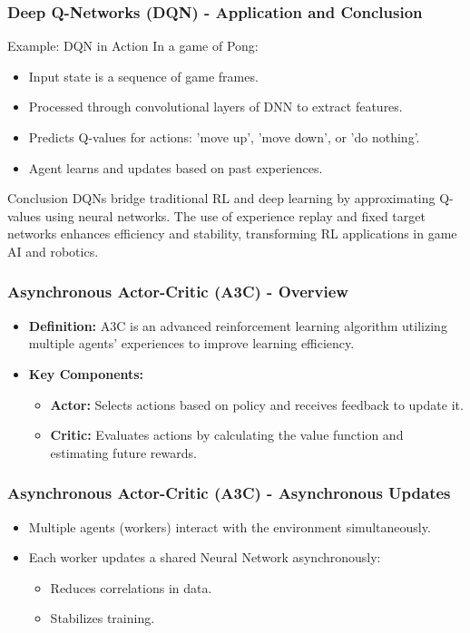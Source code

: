 \documentclass{beamer}
\begin{document}
\begin{frame}[fragile]
    \frametitle{Deep Q-Networks (DQN) - Application and Conclusion}
    \begin{block}{Example: DQN in Action}
        In a game of Pong:
        \begin{itemize}
            \item Input state is a sequence of game frames.
            \item Processed through convolutional layers of DNN to extract features.
            \item Predicts Q-values for actions: 'move up', 'move down', or 'do nothing'.
            \item Agent learns and updates based on past experiences.
        \end{itemize}
    \end{block}

    \begin{block}{Conclusion}
        DQNs bridge traditional RL and deep learning by approximating Q-values using 
        neural networks. The use of experience replay and fixed target networks 
        enhances efficiency and stability, transforming RL applications in game 
        AI and robotics.
    \end{block}
\end{frame}

\begin{frame}[fragile]
    \frametitle{Asynchronous Actor-Critic (A3C) - Overview}
    \begin{itemize}
        \item \textbf{Definition:} A3C is an advanced reinforcement learning algorithm utilizing multiple agents' experiences to improve learning efficiency.
        \item \textbf{Key Components:}
        \begin{itemize}
            \item \textbf{Actor:} Selects actions based on policy and receives feedback to update it.
            \item \textbf{Critic:} Evaluates actions by calculating the value function and estimating future rewards.
        \end{itemize}
    \end{itemize}
\end{frame}

\begin{frame}[fragile]
    \frametitle{Asynchronous Actor-Critic (A3C) - Asynchronous Updates}
    \begin{itemize}
        \item Multiple agents (workers) interact with the environment simultaneously.
        \item Each worker updates a shared Neural Network asynchronously:
        \begin{itemize}
            \item Reduces correlations in data.
            \item Stabilizes training.
        \end{itemize}
    \end{itemize}
\end{frame}
\end{document}
